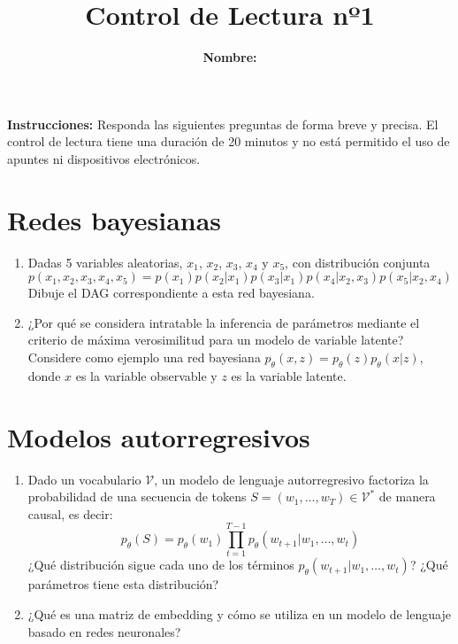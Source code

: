 \documentclass{article}
\title{\bfseries{Control de Lectura nº1}\vspace{0.5cm}}
\author{\textbf{Nombre:} \rule{12cm}{0.4pt}}
\begin{document}
\maketitle

\hspace{-0.5cm}\textbf{Instrucciones:} Responda las siguientes preguntas de forma breve y precisa. El control de lectura tiene una duración de 20 minutos y no está permitido el uso de apuntes ni dispositivos electrónicos.

\section*{Redes bayesianas}
\begin{enumerate}[{\bf P1.}]
	\item Dadas 5 variables aleatorias, $x_1$, $x_2$, $x_3$, $x_4$ y $x_5$, con distribución conjunta
	\begin{equation*}
		p(x_1,x_2,x_3,x_4,x_5)=p(x_1)p(x_2|x_1)p(x_3|x_1)p(x_4|x_2,x_3)p(x_5|x_2,x_4)
	\end{equation*}
Dibuje el DAG correspondiente a esta red bayesiana.
	\item ¿Por qué se considera intratable la inferencia de parámetros mediante el criterio de máxima verosimilitud para un modelo de variable latente? Considere como ejemplo una red bayesiana $p_\theta(x,z)=p_\theta(z)p_\theta(x|z)$, donde $x$ es la variable observable y $z$ es la variable latente.
\end{enumerate}

\section*{Modelos autorregresivos}
\begin{enumerate}[{\bf P1.}]
	\item Dado un vocabulario $\mathcal{V}$, un modelo de lenguaje autorregresivo factoriza la probabilidad de una secuencia de tokens $S=(w_1,\ldots,w_T)\in\mathcal{V}^*$ de manera causal, es decir:
	\begin{equation*}
		p_\theta(S)=p_\theta(w_1)\prod_{t=1}^{T-1} p_\theta(w_{t+1}|w_1,\ldots,w_t)
	\end{equation*}
	¿Qué distribución sigue cada uno de los términos $p_\theta(w_{t+1}|w_1,\ldots,w_t)$? ¿Qué parámetros tiene esta distribución?
	\item ¿Qué es una matriz de embedding y cómo se utiliza en un modelo de lenguaje basado en redes neuronales?
\end{enumerate}
\end{document}

